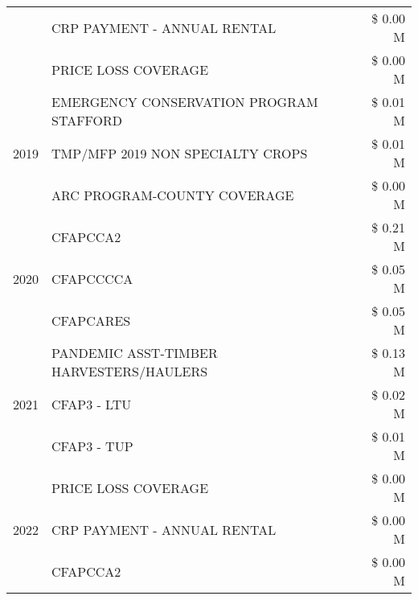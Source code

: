 \begin{tabular}{llr}
 & CRP PAYMENT - ANNUAL RENTAL & \$ 0.00 M \\
 & PRICE LOSS COVERAGE & \$ 0.00 M \\
\cline{1-3}
\multirow[t]{3}{*}{2019} & EMERGENCY CONSERVATION PROGRAM STAFFORD & \$ 0.01 M \\
 & TMP/MFP 2019 NON SPECIALTY CROPS & \$ 0.01 M \\
 & ARC PROGRAM-COUNTY COVERAGE & \$ 0.00 M \\
\cline{1-3}
\multirow[t]{3}{*}{2020} & CFAPCCA2 & \$ 0.21 M \\
 & CFAPCCCCA & \$ 0.05 M \\
 & CFAPCARES & \$ 0.05 M \\
\cline{1-3}
\multirow[t]{3}{*}{2021} & PANDEMIC ASST-TIMBER HARVESTERS/HAULERS & \$ 0.13 M \\
 & CFAP3 - LTU & \$ 0.02 M \\
 & CFAP3 - TUP & \$ 0.01 M \\
\cline{1-3}
\multirow[t]{3}{*}{2022} & PRICE LOSS COVERAGE & \$ 0.00 M \\
 & CRP PAYMENT - ANNUAL RENTAL & \$ 0.00 M \\
 & CFAPCCA2 & \$ 0.00 M \\
\cline{1-3}
\bottomrule
\end{tabular}
